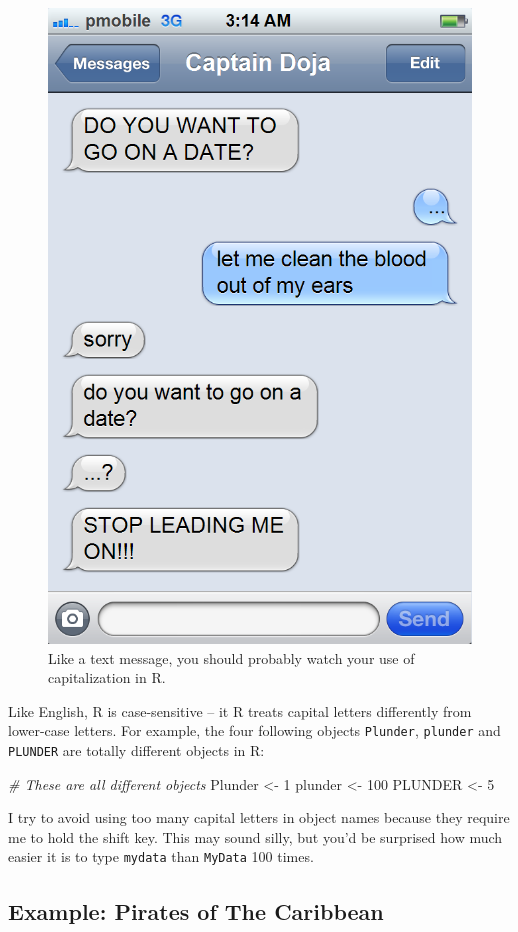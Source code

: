 \documentclass[]{book}
\newenvironment{Shaded}{\begin{snugshade}}{\end{snugshade}}
\newcommand{\DecValTok}[1]{\textcolor[rgb]{0.00,0.00,0.81}{{#1}}}
\newcommand{\StringTok}[1]{\textcolor[rgb]{0.31,0.60,0.02}{{#1}}}
\newcommand{\CommentTok}[1]{\textcolor[rgb]{0.56,0.35,0.01}{\textit{{#1}}}}
\newcommand{\NormalTok}[1]{{#1}}
\theoremstyle{definition}
\theoremstyle{definition}
\theoremstyle{remark}
\begin{document}
\begin{figure}

{\centering \includegraphics[width=0.5\linewidth]{images/datetext} 

}

\caption{Like a text message, you should probably watch your use of capitalization in R.}\label{fig:datetext}
\end{figure}

Like English, R is case-sensitive -- it R treats capital letters
differently from lower-case letters. For example, the four following
objects \texttt{Plunder}, \texttt{plunder} and \texttt{PLUNDER} are
totally different objects in R:

\begin{Shaded}
\begin{Highlighting}[]
\CommentTok{# These are all different objects}
\NormalTok{Plunder <-}\StringTok{ }\DecValTok{1}
\NormalTok{plunder <-}\StringTok{ }\DecValTok{100}
\NormalTok{PLUNDER <-}\StringTok{ }\DecValTok{5}
\end{Highlighting}
\end{Shaded}

I try to avoid using too many capital letters in object names because
they require me to hold the shift key. This may sound silly, but you'd
be surprised how much easier it is to type \texttt{mydata} than
\texttt{MyData} 100 times.

\subsection{Example: Pirates of The
Caribbean}\label{example-pirates-of-the-caribbean}
\end{document}
